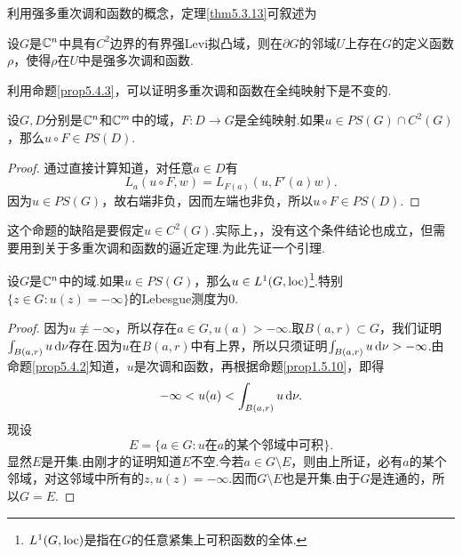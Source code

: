 利用强多重次调和函数的概念，定理\ref{thm5.3.13}可叙述为
\begin{theorem}\label{thm5.4.5}
	设$G$是$\mathbb C^n$中具有$C^2$边界的有界强Levi拟凸域，则在$\partial G$的邻域$U$上存在$G$的定义函数$\rho$，使得$\rho$在$U$中是强多次调和函数.
\end{theorem}
利用命题\ref{prop5.4.3}，可以证明多重次调和函数在全纯映射下是不变的.
\begin{prop}\label{prop5.4.6}
	设$G,D$分别是$\mathbb C^n$和$\mathbb C^m$中的域，$F\colon D\to G$是全纯映射.如果$u\in PS(G)\cap C^2(G)$，那么$u\circ F\in PS(D)$.
\end{prop}
\begin{proof}
	通过直接计算知道，对任意$a\in D$有
	\[L_a(u\circ F,w)=L_{F(a)}(u,F'(a)w).\]
	因为$u\in PS(G)$，故右端非负，因而左端也非负，所以$u\circ F\in PS(D)$.
\end{proof}
这个命题的缺陷是要假定$u\in C^2(G)$.实际上，，没有这个条件结论也成立，但需要用到关于多重次调和函数的逼近定理.为此先证一个引理.
\begin{lemma}\label{lem5.4.7}
	设$G$是$\mathbb C^n$中的域.如果$u\in PS(G)$，那么$u\in L^1(G,\operatorname{loc})$\footnote{$L^1(G,\operatorname{loc})$是指在$G$的任意紧集上可积函数的全体.}.特别$\{z\in G\colon u(z)=-\infty\}$的Lebesgue测度为$0$.
\end{lemma}
\begin{proof}
	因为$u\not\equiv-\infty$，所以存在$a\in G,u(a)>-\infty$.取$B(a,r)\subset G$，我们证明$\int_{B(a,r)}u\mathop{}\!\mathrm{d}\nu$存在.因为$u$在$B(a,r)$中有上界，所以只须证明$\int_{B(a,r)}u\mathop{}\!\mathrm{d}\nu>-\infty$.由命题\ref{prop5.4.2}知道，$u$是次调和函数，再根据命题\ref{prop1.5.10}，即得
	\[-\infty<u(a)<\int_{B(a,r)}u\mathop{}\!\mathrm{d}\nu.\]
	现设
	\[E=\{a\in G\colon\text{$u$在$a$的某个邻域中可积}\}.\]
	显然$E$是开集.由刚才的证明知道$E$不空.今若$a\in G\setminus E$，则由上所证，必有$a$的某个邻域，对这邻域中所有的$z,u(z)=-\infty$.因而$G\setminus E$也是开集.由于$G$是连通的，所以$G=E$.
\end{proof}
